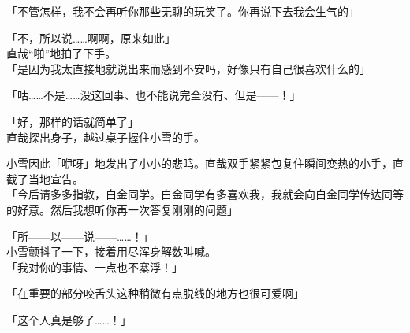 「不管怎样，我不会再听你那些无聊的玩笑了。你再说下去我会生气的」

「不，所以说……啊啊，原来如此」\\

直哉“啪”地拍了下手。\\

「是因为我太直接地就说出来而感到不安吗，好像只有自己很喜欢什么的」

「咕……不是……没这回事、也不能说完全没有、但是——！」

「好，那样的话就简单了」\\

直哉探出身子，越过桌子握住小雪的手。

小雪因此「咿呀」地发出了小小的悲鸣。直哉双手紧紧包复住瞬间变热的小手，直截了当地宣告。\\

「今后请多多指教，白金同学。白金同学有多喜欢我，我就会向白金同学传达同等的好意。然后我想听你再一次答复刚刚的问题」

「所——以——说——……！」\\

小雪颤抖了一下，接着用尽浑身解数叫喊。\\

「我对你的事情、一点也不寨浮！」

「在重要的部分咬舌头这种稍微有点脱线的地方也很可爱啊」

「这个人真是够了……！」

